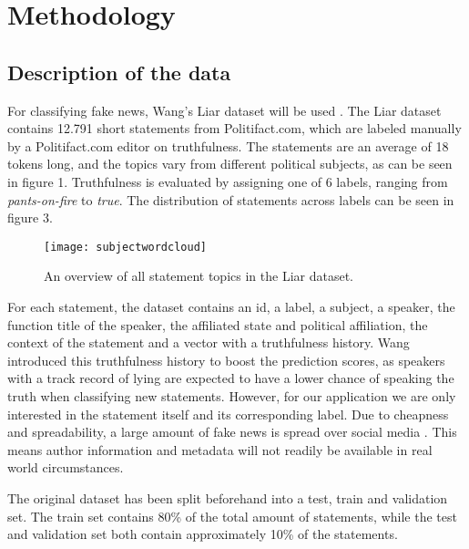 \section{Methodology}

\subsection{Description of the data}
For classifying fake news, Wang's Liar dataset will be used \cite{wang2018}. 
The Liar dataset contains 12.791 short statements from Politifact.com, which are labeled manually by a Politifact.com editor on truthfulness. 
The statements are an average of 18 tokens long, and the topics vary from different political subjects, as can be seen in figure 1.
Truthfulness is evaluated by assigning one of 6 labels, ranging from \textit{pants-on-fire} to \textit{true}. 
The distribution of statements across labels can be seen in figure 3.

\begin{figure}[h]
    \centering
    \texttt{[image: subjectwordcloud]}
    \caption{An overview of all statement topics in the Liar dataset.}
\end{figure}

For each statement, the dataset contains an id, a label, a subject, a speaker, the function title of the speaker, the affiliated state and political affiliation, the context of the statement and a vector with a truthfulness history.
Wang introduced this truthfulness history to boost the prediction scores, as speakers with a track record of lying are expected to have a lower chance of speaking the truth when classifying new statements.
However, for our application we are only interested in the statement itself and its corresponding label. 
Due to cheapness and spreadability, a large amount of fake news is spread over social media \cite{shu2017}. 
This means author information and metadata will not readily be available in real world circumstances.

The original dataset has been split beforehand into a test, train and validation set. 
The train set contains 80\% of the total amount of statements, while the test and validation set both contain approximately 10\% of the statements. 

